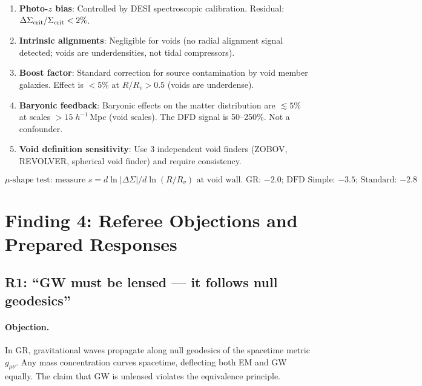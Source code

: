 \documentclass[11pt,a4paper]{article}
\begin{document}
\begin{enumerate}
\item \textbf{Photo-$z$ bias}: Controlled by DESI spectroscopic
  calibration.  Residual: $\Delta\Sigma_{\rm crit}/\Sigma_{\rm crit}
  < 2\%$.
\item \textbf{Intrinsic alignments}: Negligible for voids (no
  radial alignment signal detected; voids are underdensities,
  not tidal compressors).
\item \textbf{Boost factor}: Standard correction for source
  contamination by void member galaxies.  Effect is $< 5\%$ at
  $R/R_v > 0.5$ (voids are underdense).
\item \textbf{Baryonic feedback}: Baryonic effects on the matter
  distribution are $\lesssim 5\%$ at scales $> 15\;h^{-1}$\,Mpc
  (void scales).  The DFD signal is 50--250\%.  Not a confounder.
\item \textbf{Void definition sensitivity}: Use 3 independent void
  finders (ZOBOV, REVOLVER, spherical void finder) and require
  consistency.
\end{enumerate}

\begin{equation}
\boxed{
\text{$\mu$-shape test: measure } s = d\ln|\Delta\Sigma|/d\ln(R/R_v)
\text{ at void wall. GR: $-2.0$; DFD Simple: $-3.5$; Standard: $-2.8$}
}
\end{equation}


\section{Finding 4: Referee Objections and Prepared Responses}
\label{sec:referee}

\subsection{R1: ``GW must be lensed --- it follows null geodesics''}

\paragraph{Objection.}
In GR, gravitational waves propagate along null geodesics of the
spacetime metric $g_{\mu\nu}$.  Any mass concentration curves
spacetime, deflecting both EM and GW equally.  The claim that GW is
unlensed violates the equivalence principle.
\end{document}
